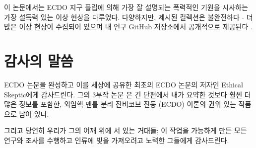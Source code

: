 \documentclass[10pt,twocolumn,letterpaper]{article}
\begin{document}
이 논문에서는 ECDO 지구 플립에 의해 가장 잘 설명되는 폭력적인 기원을 시사하는 가장 설득력 있는 이상 현상을 다루었다. 다양하지만, 제시된 컬렉션은 불완전하다 - 더 많은 이상 현상이 수집되어 있으며 내 연구 GitHub 저장소에서 공개적으로 제공된다 \cite{2}.

\section{감사의 말씀}

ECDO 논문을 완성하고 이를 세상에 공유한 최초의 ECDO 논문의 저자인 Ethical Skeptic에게 감사드린다. 그의 3부작 논문 \cite{1}은 긴 단편에서 내가 요약한 것보다 훨씬 더 많은 정보를 포함한, 외엄핵-맨틀 분리 잔비코브 진동 (ECDO) 이론의 권위 있는 작품으로 남아 있다.

그리고 당연히 우리가 그의 어깨 위에 서 있는 거대들; 이 작업을 가능하게 만든 모든 연구와 조사를 수행하고 인류에 빛을 가져오려고 노력한 그들에게 감사드린다.

{\small


}
\end{document}
